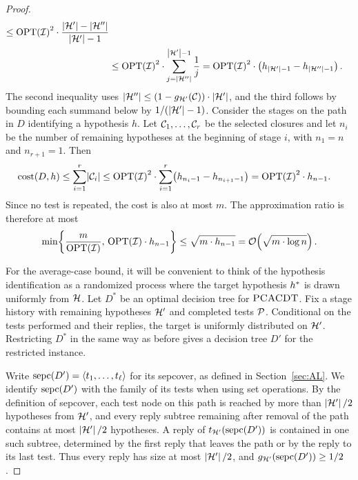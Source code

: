 \begin{proof}
\begin{align*}
    \leq\textup{\text{OPT}}\mathopen{}\left( \mathcal{I} \right)^2\cdot\frac{\mathopen{}\left| \mathcal{H}' \right|-\mathopen{}\left| \mathcal{H}'' \right|}{\mathopen{}\left| \mathcal{H}' \right|-1}\\
    &\leq\textup{\text{OPT}}\mathopen{}\left( \mathcal{I} \right)^2\cdot\sum_{j=\mathopen{}\left| \mathcal{H}'' \right|}^{\mathopen{}\left| \mathcal{H}' \right|-1}\frac1j
    =\textup{\text{OPT}}\mathopen{}\left( \mathcal{I} \right)^2\cdot\mathopen{}\left( h_{\mathopen{}\left| \mathcal{H}' \right|-1}-h_{\mathopen{}\left| \mathcal{H}'' \right|-1} \right).
\end{align*}
The second inequality uses $\mathopen{}\left| \mathcal{H}'' \right|\leq\mathopen{}\left( 1-g_{\mathcal{H}'}(\mathcal{C}) \right)\cdot\mathopen{}\left| \mathcal{H}' \right|$, and the third follows by bounding each summand below by $1/(\mathopen{}\left| \mathcal{H}' \right|-1)$. Consider the stages on the path in $D$ identifying a hypothesis $h$. Let $\mathcal{C}_1,\ldots,\mathcal{C}_r$ be the selected closures and let $n_i$ be the number of remaining hypotheses at the beginning of stage $i$, with $n_1=n$ and $n_{r+1}=1$. Then
\begin{align*}
    \operatorname{cost}\mathopen{}\left( D,h \right)
    &\leq\sum_{i=1}^{r}\mathopen{}\left| \mathcal{C}_i \right|
    \leq\textup{\text{OPT}}\mathopen{}\left( \mathcal{I} \right)^2\cdot\sum_{i=1}^{r}\mathopen{}\left( h_{n_i-1}-h_{n_{i+1}-1} \right)
    =\textup{\text{OPT}}\mathopen{}\left( \mathcal{I} \right)^2\cdot h_{n-1}.
\end{align*}
Since no test is repeated, the cost is also at most $m$. The approximation ratio is therefore at most
\[
    \min\mathopen{}\left\{ \frac{m}{\textup{\text{OPT}}\mathopen{}\left( \mathcal{I} \right)},\,\textup{\text{OPT}}\mathopen{}\left( \mathcal{I} \right)\cdot h_{n-1} \right\}
    \leq\sqrt{m\cdot h_{n-1}}
    =\mathcal{O}\mathopen{}\left( \sqrt{m\cdot\log n} \right).
\]

For the average-case bound, it will be convenient to think of the hypothesis identification as a randomized process where the target hypothesis $h^*$ is drawn uniformly from $\mathcal{H}$.
Let $D^*$ be an optimal decision tree for $\textup{\textsc{PCACDT}}$. Fix a stage history with remaining hypotheses $\mathcal{H}'$ and completed tests $\mathcal{P}$. Conditional on the tests performed and their replies, the target is uniformly distributed on $\mathcal{H}'$. Restricting $D^*$ in the same way as before gives a decision tree $D'$ for the restricted instance.

Write $\operatorname{sepc}\mathopen{}\left( D' \right)=\mathopen{}\langle t_1,\ldots,t_\ell \rangle$ for its sepcover, as defined in Section~\ref{sec:AL}. We identify $\operatorname{sepc}\mathopen{}\left( D' \right)$ with the family of its tests when using set operations. By the definition of sepcover, each test node on this path is reached by more than $\mathopen{}\left| \mathcal{H}' \right|/2$ hypotheses from $\mathcal{H}'$, and every reply subtree remaining after removal of the path contains at most $\mathopen{}\left| \mathcal{H}' \right|/2$ hypotheses. A reply of $t_{\mathcal{H}'}\mathopen{}\left( \operatorname{sepc}\mathopen{}\left( D' \right) \right)$ is contained in one such subtree, determined by the first reply that leaves the path or by the reply to its last test. Thus every reply has size at most $\mathopen{}\left| \mathcal{H}' \right|/2$, and $g_{\mathcal{H}'}\mathopen{}\left( \operatorname{sepc}\mathopen{}\left( D' \right) \right)\geq 1/2$.


\end{proof}
